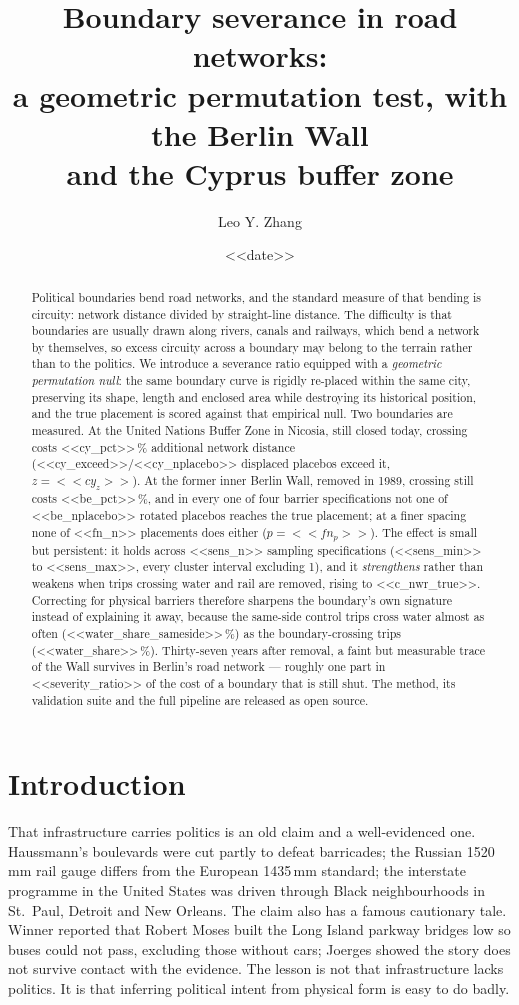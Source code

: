 \documentclass[11pt,a4paper]{article}
\title{\bfseries Boundary severance in road networks:\\
a geometric permutation test, with the Berlin Wall\\ and the Cyprus buffer zone}
\author{Leo Y. Zhang}
\date{<<date>>}
\begin{document}
\maketitle

\begin{abstract}
\noindent
Political boundaries bend road networks, and the standard measure of that
bending is circuity: network distance divided by straight-line distance. The
difficulty is that boundaries are usually drawn along rivers, canals and
railways, which bend a network by themselves, so excess circuity across a
boundary may belong to the terrain rather than to the politics. We introduce a
severance ratio equipped with a \emph{geometric permutation null}: the same
boundary curve is rigidly re-placed within the same city, preserving its shape,
length and enclosed area while destroying its historical position, and the true
placement is scored against that empirical null. Two boundaries are measured.
At the United Nations Buffer Zone in Nicosia, still closed today, crossing costs
<<cy_pct>>\,\% additional network distance
(<<cy_exceed>>/<<cy_nplacebo>> displaced placebos exceed it, $z = <<cy_z>>$).
At the former inner Berlin Wall, removed in 1989, crossing still costs
<<be_pct>>\,\%, and in every one of four barrier specifications not one of
<<be_nplacebo>> rotated placebos reaches the true placement; at a finer spacing
none of <<fn_n>> placements does either ($p = <<fn_p>>$). The effect is small
but persistent: it holds across <<sens_n>> sampling specifications
(<<sens_min>> to <<sens_max>>, every cluster interval excluding 1), and it
\emph{strengthens} rather than weakens when trips crossing water and rail are
removed, rising to <<c_nwr_true>>. Correcting for physical barriers therefore
sharpens the boundary's own signature instead of explaining it away, because
the same-side control trips cross water almost as often
(<<water_share_sameside>>\,\%) as the boundary-crossing trips
(<<water_share>>\,\%). Thirty-seven years after removal, a faint but measurable
trace of the Wall survives in Berlin's road network --- roughly one part in
<<severity_ratio>> of the cost of a boundary that is still shut. The method, its validation suite and
the full pipeline are released as open source.
\end{abstract}

\section{Introduction}

That infrastructure carries politics is an old claim and a well-evidenced one.
Haussmann's boulevards were cut partly to defeat barricades; the Russian
1520\,mm rail gauge differs from the European 1435\,mm standard; the interstate
programme in the United States was driven through Black neighbourhoods in
St.\ Paul, Detroit and New Orleans. The claim also has a famous cautionary tale.
Winner \cite{winner1980} reported that Robert Moses built the Long Island
parkway bridges low so buses could not pass, excluding those without cars;
Joerges \cite{joerges1999} showed the story does not survive contact with the
evidence. The lesson is not that infrastructure lacks politics. It is that
inferring political intent from physical form is easy to do badly.
\end{document}
